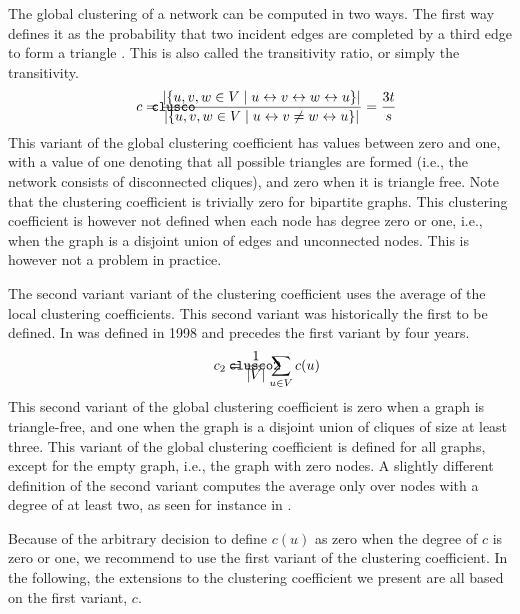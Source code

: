 \documentclass{article}
\def\mathnote#1{%
  \tag*{\rlap{\hspace\marginparsep\smash{\parbox[t]{\marginparwidth}{#1}}}}
}
\begin{document}
The global clustering of a network can be computed in two ways.  The
first way defines it as the probability that two incident edges are
completed by a third edge to form a triangle \citep{b736}. This is also
called the transitivity ratio, or simply the transitivity.
\begin{align}
  \mathnote{\texttt{clusco}} c &= 
  \frac {|\{ u, v, w \in V \mid u \leftrightarrow v \leftrightarrow w \leftrightarrow u \}|} 
        {|\{ u, v, w \in V \mid u \leftrightarrow v \neq w \leftrightarrow u \}|} 
        = \frac {3t} s
\end{align}
This variant of the global clustering coefficient has values between
zero and one, with a value of one denoting that all possible triangles
are formed (i.e., the network consists of disconnected cliques), and
zero when it is triangle free.  Note that the clustering coefficient is
trivially zero for bipartite graphs.  This clustering coefficient is
however not defined when each node has degree zero or one, i.e., when
the graph is a disjoint union of edges and unconnected nodes.  This is
however not a problem in practice.

The second variant variant of the clustering coefficient uses the
average of the local clustering coefficients. This second variant was
historically the first to be defined.  In was defined in
1998 \citep{b228} and precedes the first variant by four years.
\begin{align}
  \mathnote{\texttt{clusco2}} c_2 &= \frac 1 {|V|} \sum_{u \in V} c(u)
\end{align}
This second variant of the global clustering coefficient is zero when a
graph is triangle-free, and one when the graph is a disjoint union of
cliques of size at least three.  This variant of the global clustering
coefficient is defined for all graphs, except for the empty graph, i.e.,
the graph with zero nodes.  A slightly different definition of the
second variant computes the average only over nodes with a degree of at
least two, as seen for instance in \citep{b845}.

Because of the arbitrary decision to define $c(u)$ as zero when the
degree of $c$ is zero or one, we recommend to use the first variant of
the clustering coefficient.  In the following, the extensions to the
clustering coefficient we present are all based on the first variant,
$c$.
\end{document}
